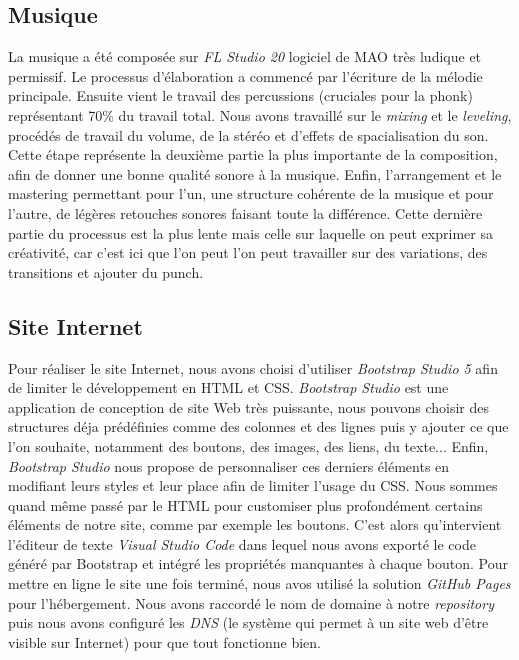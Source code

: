 \documentclass[12pt,a4paper]{article}
\begin{document}
\clearpage

\subsection{Musique}
La musique a été composée sur \textit{FL Studio 20} logiciel de MAO
très ludique et permissif. Le processus d'élaboration a commencé par
l'écriture de la mélodie principale. Ensuite vient le travail des percussions
(cruciales pour la phonk) représentant 70\% du travail total.
Nous avons travaillé sur le \textit{mixing} et le \textit{leveling},
procédés de travail du volume, de la stéréo et d'effets de spacialisation 
du son. Cette étape représente la deuxième partie la plus importante de la 
composition, afin de donner une bonne qualité sonore à la musique.
Enfin, l'arrangement et le mastering permettant pour l'un, une 
structure cohérente de la musique et pour l'autre, de légères retouches
sonores faisant toute la différence. Cette dernière partie du processus 
est la plus lente mais celle sur laquelle on peut exprimer sa créativité,
car c'est ici que l'on peut l'on peut travailler sur des variations, 
des transitions et ajouter du punch.

\subsection{Site Internet}
Pour réaliser le site Internet, nous avons choisi d'utiliser \textit{Bootstrap 
Studio 5} afin de limiter le développement en HTML et CSS. \textit{Bootstrap 
Studio} est une application de conception de site Web très puissante,
nous pouvons choisir des structures déja prédéfinies comme des colonnes
et des lignes puis y ajouter ce que l'on souhaite, notamment des boutons, 
des images, des liens, du texte... Enfin, \textit{Bootstrap Studio} nous 
propose de personnaliser ces derniers éléments en modifiant leurs styles 
et leur place afin de limiter l'usage du CSS. Nous sommes quand même passé 
par le HTML pour customiser plus profondément certains éléments de notre site,
comme par exemple les boutons. C'est alors qu'intervient l'éditeur de texte
\textit{Visual Studio Code} dans lequel nous avons exporté le code généré 
par Bootstrap et intégré les propriétés manquantes à chaque bouton. 
Pour mettre en ligne le site une fois terminé, nous avos utilisé
la solution \textit{GitHub Pages} pour l'hébergement. Nous avons raccordé
le nom de domaine à notre \textit{repository} puis nous avons configuré
les \textit{DNS} (le système qui permet à un site web d'être visible sur
Internet) pour que tout fonctionne bien.
\end{document}
